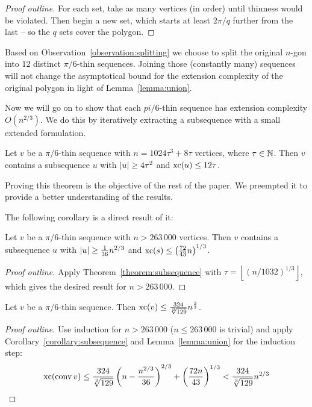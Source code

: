 \begin{proof}[Proof outline]
  For each set, take as many vertices (in order) until thinness would be violated. Then begin a new set, which starts at least $2\pi/q$ further from the last -- so the $q$ sets cover the polygon.
\end{proof}

Based on Observation~\ref{observation:splitting} we choose to split the original $n$-gon into $12$ distinct $\pi/6$-thin sequences. Joining those (constantly many) sequences will not change the asymptotical bound for the extension complexity of the original polygon in light of Lemma~\ref{lemma:union}.

Now we will go on to show that each $pi/6$-thin sequence has extension complexity $O(n^{2/3})$. We do this by iteratively extracting a subsequence with a small extended formulation.

\begin{theorem}\label{theorem:subsequence}
  Let $v$ be a $\pi/6$-thin sequence with $n = 1024\tau^3 + 8\tau$ vertices, where $\tau \in \mathbb{N}$. 
  Then $v$ contains a subsequence $u$ with $\lvert u\rvert \geq 4\tau^2$ and $\operatorname{xc}(u) \leq 12\tau$.
\end{theorem}

Proving this theorem is the objective of the rest of the paper. We preempted it to provide a better understanding of the results.

The following corollary is a direct result of it: 

\begin{corollary}\label{corollary:subsequence}
  Let $v$ be a $\pi/6$-thin sequence with $n > 263\,000$ vertices. 
  Then $v$ contains a subsequence $u$ with $\lvert u\rvert \geq \frac{1}{36} n^{2/3}$ and $\operatorname{xc}(s) \leq \left( \frac{72}{43}n \right)^{1/3}$.
\end{corollary}

\begin{proof}[Proof outline]
  Apply Theorem~\ref{theorem:subsequence} with $\tau=\left\lfloor (n/1032)^{1/3} \right\rfloor$, which gives the desired result for $n > 263\,000$.
\end{proof}

\begin{corollary}\label{corollary:thin-xc}
  Let $v$ be a $\pi/6$-thin sequence. Then $\operatorname{xc}(v) \leq \frac{324}{\sqrt[3]{129}} n^{\frac{2}{3}}$.
\end{corollary}

\begin{proof}[Proof outline]
  Use induction for $n > 263\,000$ ($n \leq 263\,000$ is trivial) and apply Corollary~\ref{corollary:subsequence} and Lemma~\ref{lemma:union} for the induction step: $$\operatorname{xc}(\operatorname{conv} v) \leq \frac{324}{\sqrt[3]{129}} \left(n-\frac{n^{2/3}}{36}\right)^{2/3}+\left(\frac{72n}{43}\right)^{1/3} < \frac{324}{\sqrt[3]{129}}n^{2/3}$$
\end{proof}

